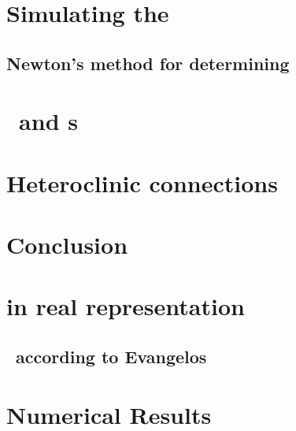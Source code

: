 \documentclass[hyperref]{inputs/gatech-thesis}
\begin{document}

\chapter{Simulating the \KSe}
\label{chap:Numerics}
    \section{Newton's method for determining \reqva}
        


\chapter{\Eqva\ and \po s}

\chapter{Heteroclinic connections}

\chapter{Conclusion}



\appendix

\chapter{\KSe in real representation}

\section{\KSe\ according to Evangelos}


\chapter{Numerical Results}

         \PublicPrivate{
         }{ %
%  
         } %
\begin{postliminary}
{}
\begin{vita}
    
\end{vita}
\end{postliminary}
\end{document}
